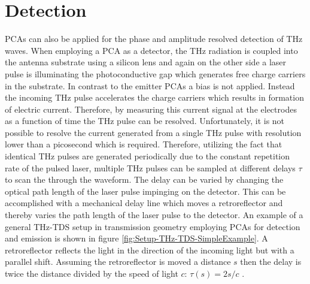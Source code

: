 \section{Detection}
\label{sec:thz-detection}
PCAs can also be applied for the phase and amplitude resolved detection of THz waves. When employing a PCA as a detector, the THz radiation is coupled into the antenna substrate using a silicon lens and again on the other side a laser pulse is illuminating the photoconductive gap which generates free charge carriers in the substrate. In contrast to the emitter PCAs a bias is not applied. Instead the incoming THz pulse accelerates the charge carriers which results in formation of electric current. Therefore, by measuring this current signal at the electrodes as a function of time the THz pulse can be resolved. Unfortunately, it is not possible to resolve the current generated from a single THz pulse with resolution lower than a picosecond which is required. Therefore, utilizing the fact that identical THz pulses are generated periodically due to the constant repetition rate of the pulsed laser, multiple THz pulses can be sampled at different delays $\tau$ to scan the through the waveform. The delay can be varied by changing the optical path length of the laser pulse impinging on the detector. This can be accomplished with a mechanical delay line which moves a retroreflector and thereby varies the path length of the laser pulse to the detector. An example of a general THz-TDS setup in transmission geometry employing PCAs for detection and emission is shown in figure \ref{fig:Setup-THz-TDS-SimpleExample}. A retroreflector reflects the light in the direction of the incoming light but with a parallel shift. Assuming the retroreflector is moved a distance $s$ then the delay is twice the distance divided by the speed of light $c$: $\tau(s) = 2s/c$ \cite{Rutz2007}.  

